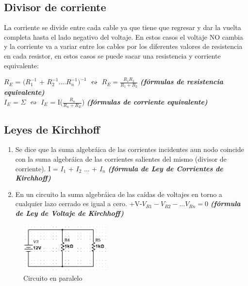 \documentclass[a4paper,11pt]{article}
\begin{document}
\subsection{Divisor de corriente}
\noindent La corriente se divide entre cada cable ya que tiene que regresar y dar la vuelta completa hasta el lado negativo del voltaje. En estos casos el voltaje NO cambia y la corriente va a variar  entre los cables por los diferentes valores de resistencia en cada resistor, en estos casos se puede sacar una resistencia y corriente equivalente:
\begin{center}
    
    $R_E$ = $(R_1^{-1}$ + $R_2^{-1}$....$R_n^{-1})^{-1}$ $\leftrightsquigarrow$  $R_E = \frac{R_1R_2}{R_1+R_2}$ \textcolor[cmyk]{1,0,1,0}{\textbf{\textit{(fórmulas de resistencia equivalente)}}}
    \vspace{0.2cm}\\
    $I_E$ = $\Sigma$ $\leftrightsquigarrow$ $I_E$ = I($\frac{R_n}{R_n+R_E}$) \textcolor[cmyk]{1,0,1,0}{\textbf{\textit{(fórmulas de corriente equivalente)}}}
\end{center}
\subsection{Leyes de Kirchhoff}
\noindent \begin{enumerate}
    \item Se dice que la suma algebráica de las corrientes incidentes  aun nodo coincide con la suma algebráica de las corrientes salientes del mismo (divisor de corriente). I = $I_1$ + $I_2$ ... + $I_n$ \textcolor[cmyk]{1,0,1,0}{\textbf{\textit{(fórmula de Ley de Corrientes de Kirchhoff)}}}
    \item En un circuito la suma algebráica de las caídas de voltajes en torno a cualquier lazo cerrado es igual a cero. +V-$V_{R1} - V_{R2}-...V_{Rn} = 0$ \textcolor[cmyk]{1,0,1,0}{\textbf{\textit{(fórmula de Ley de Voltaje de Kirchhoff)}}}
\end{enumerate}

\begin{figure}[H]
    \centering
     \includegraphics[width=0.4\textwidth]{images/paralelo.PNG}
     \caption{Circuito en paralelo}
     \label{fig:cp}
\end{figure}
\end{document}
